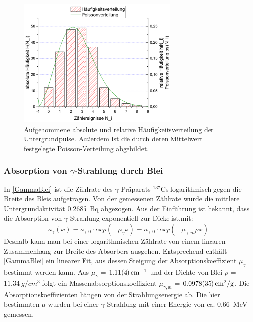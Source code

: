 \documentclass[
	a4paper,
	12pt,
	pagesize,
	ngerman
]{scrartcl}
\begin{document}
	\begin{figure}[H]
		\includegraphics[width=0.7\textwidth]{Untergrund}
		\centering
		\caption{Aufgenommene absolute und relative Häufigkeitsverteilung der Untergrundpulse. Außerdem ist die durch deren Mittelwert festgelegte Poisson-Verteilung abgebildet.}%
		\label{Untergrund}
		\centering
	\end{figure}

	\subsubsection{Absorption von $\gamma$-Strahlung durch Blei} \label{blei}
	In \cref{GammaBlei} ist die Zählrate des $\gamma$-Präparats $ ^{137}$Cs logarithmisch gegen die Breite des Bleis aufgetragen. 
	Von der gemessenen Zählrate wurde die mittlere Untergrundaktivität \SI{0,2685}{Bq} abgezogen.
	Aus der Einführung ist bekannt, dass die Absorption von $\gamma$-Strahlung exponentiell zur Dicke ist,mit:
	\begin{equation}
		a_{\gamma}(x) = a_{\gamma,0} \cdot exp(-\mu_\gamma x)= a_{\gamma,0} \cdot exp(-\mu_{\gamma,m} \rho x)
		\label{gamma}
	\end{equation}
	 Deshalb kann man bei einer logarithmischen Zählrate von einem linearen Zusammenhang zur Breite des Absorbers ausgehen. 
	 Entsprechend enthält \cref{GammaBlei} ein linearer Fit, aus dessen Steigung der Absorptionskoeffizient $\mu_\gamma$ bestimmt werden kann.
	 Aus $\mu_\gamma$ = $\SI{1,11 +- 0,04}{cm^{-1}}$ und der Dichte von Blei $\rho$ = $\SI{11,34}{g/cm^3}$ folgt ein Massenabsorptionskoeffizient $\mu_{\gamma,m}$ = $\SI{0,0978+-0,0035}{cm^2/g}$.\cite{dichten}
	 Die Absorptionskoeffizienten hängen von der Strahlungsenergie ab. 
	 Die hier bestimmten $\mu$ wurden bei einer $\gamma$-Strahlung mit einer Energie von ca. \SI{0,66}{MeV} gemessen. %
	 
\end{document}
